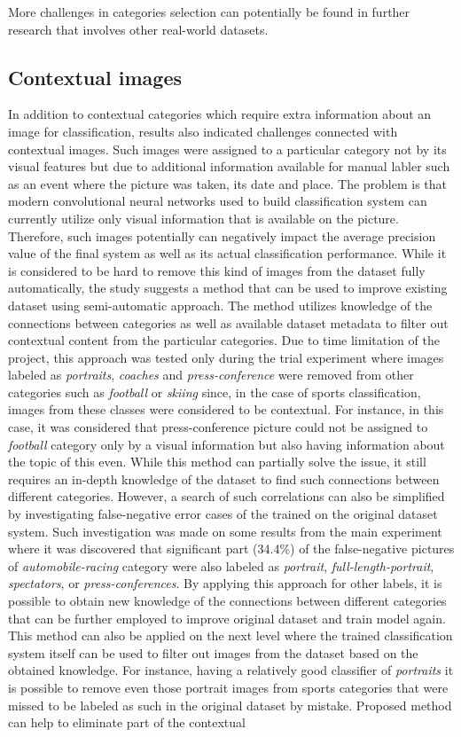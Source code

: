 More challenges in categories selection can potentially be found in further research that involves other real-world datasets.

\subsection{Contextual images}
In addition to contextual categories which require extra information about an image for classification, results also indicated challenges connected with contextual images. Such images were assigned to a particular category not by its visual features but due to additional information available for manual labler such as an event where the picture was taken, its date and place. The problem is that modern convolutional neural networks used to build classification system can currently utilize only visual information that is available on the picture. Therefore, such images potentially can negatively impact the average precision value of the final system as well as its actual classification performance. While it is considered to be hard to remove this kind of images from the dataset fully automatically, the study suggests a method that can be used to improve existing dataset using semi-automatic approach. The method utilizes knowledge of the connections between categories as well as available dataset metadata to filter out contextual content from the particular categories. Due to time limitation of the project, this approach was tested only during the trial experiment where images labeled as \textit{portraits}, \textit{coaches} and \textit{press-conference} were removed from other categories such as \textit{football} or \textit{skiing} since, in the case of sports classification, images from these classes were considered to be contextual. For instance, in this case, it was considered that press-conference picture could not be assigned to \textit{football} category only by a visual information but also having information about the topic of this even. While this method can partially solve the issue, it still requires an in-depth knowledge of the dataset to find such connections between different categories. However, a search of such correlations can also be simplified by investigating false-negative error cases of the trained on the original dataset system. Such investigation was made on some results from the main experiment where it was discovered that significant part (34.4\%) of the false-negative pictures of \textit{automobile-racing} category were also labeled as \textit{portrait}, \textit{full-length-portrait}, \textit{spectators}, or \textit{press-conferences}. By applying this approach for other labels, it is possible to obtain new knowledge of the connections between different categories that can be further employed to improve original dataset and train model again. This method can also be applied on the next level where the trained classification system itself can be used to filter out images from the dataset based on the obtained knowledge. For instance, having a relatively good classifier of \textit{portraits} it is possible to remove even those portrait images from sports categories that were missed to be labeled as such in the original dataset by mistake. Proposed method can help to eliminate part of the contextual 